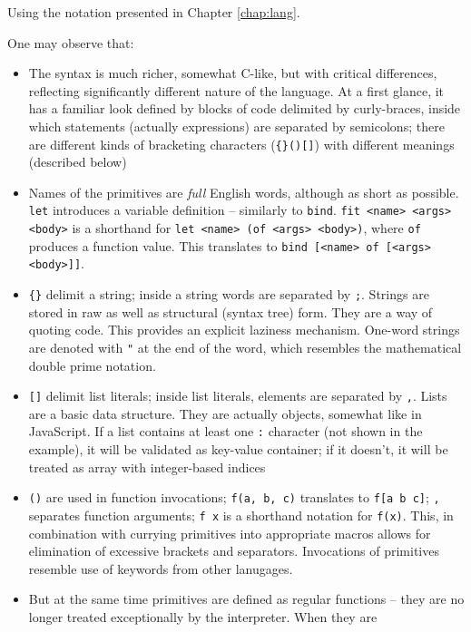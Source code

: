 Using the notation presented in Chapter \ref{chap:lang}.

One may observe that:
\begin{itemize}
    \item The syntax is much richer, somewhat C-like, but with critical
    differences, reflecting significantly different nature of the language. At
    a first glance, it has a familiar look defined by blocks of code delimited
    by curly-braces, inside which statements (actually expressions) are
    separated by semicolons; there are different kinds of bracketing
    characters (\texttt{\{\}()[]}) with different meanings (described below)
    \item Names of the primitives are \textit{full} English words, although as
    short as possible. \texttt{let} introduces a variable definition --
    similarly to \texttt{bind}. \texttt{fit <name> <args> <body>} is a
    shorthand for \texttt{let <name> (of <args> <body>)}, where \texttt{of}
    produces a function value. This translates to \texttt{bind [<name> of
        [<args> <body>]]}.
    \item \texttt{\{\}} delimit a string; inside a string words are separated by
    \texttt{;}. Strings are stored in raw as well as structural (syntax tree)
    form. They are a way of quoting code. This provides an explicit laziness
    mechanism. One-word strings are denoted with \texttt{"} at the end of the
    word, which resembles the mathematical double prime notation.
    \item \texttt{[]} delimit list literals; inside list literals, elements are
    separated by \texttt{,}. Lists are a basic data structure. They are
    actually objects, somewhat like in JavaScript. If a list contains at least
    one \texttt{:} character (not shown in the example), it will be validated
    as key-value container; if it doesn't, it will be treated as array with
    integer-based indices
    \item \texttt{()} are used in function invocations; \texttt{f(a, b, c)}
    translates to \texttt{f[a b c]}; \texttt{,} separates function arguments;
    \texttt{f x} is a shorthand notation for \texttt{f(x)}. This, in
    combination with currying primitives into appropriate macros allows for
    elimination of excessive brackets and separators. Invocations of
    primitives resemble use of keywords from other lanugages.
    \item But at the same time primitives are defined as regular functions --
    they are no longer treated exceptionally by the interpreter. When they are

\end{itemize}
